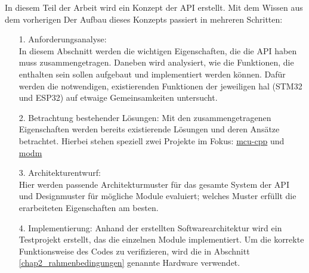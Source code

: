 In diesem Teil der Arbeit wird ein Konzept der API erstellt.
Mit dem Wissen aus dem vorherigen
Der Aufbau dieses Konzepts passiert in mehreren Schritten:
\begin{itemize}
	\item [1.]  Anforderungsanalyse: \\In diesem Abschnitt werden die wichtigen Eigenschaften, die die API haben muss zusammengetragen. Daneben wird analysiert, wie die Funktionen, die enthalten sein sollen aufgebaut und implementiert werden können. Dafür werden die notwendigen, existierenden Funktionen der jeweiligen \gls{hal} (STM32 und ESP32) auf etwaige Gemeinsamkeiten untersucht.
 	\item [2.] 	Betrachtung bestehender Lösungen: Mit den zusammengetragenen Eigenschaften werden bereits existierende Lösungen und deren Ansätze betrachtet. Hierbei stehen speziell zwei Projekte im Fokus: \href{https://github.com/yh-sb/mcu-cpp.git}{mcu-cpp} und \href{https://github.com/modm-io/modm.git}{modm} %
	\item [3.] Architekturentwurf: \\Hier werden passende Architekturmuster für das gesamte System der API und Designmuster für mögliche Module evaluiert; welches Muster erfüllt die erarbeiteten Eigenschaften am besten.
	\item [4.] Implementierung: Anhand der erstellten Softwarearchitektur wird ein Testprojekt erstellt, das die einzelnen Module implementiert. Um die korrekte Funktionsweise des Codes zu verifizieren, wird die in Abschnitt \ref{chap2_rahmenbedingungen} genannte Hardware verwendet. 
\end{itemize}


